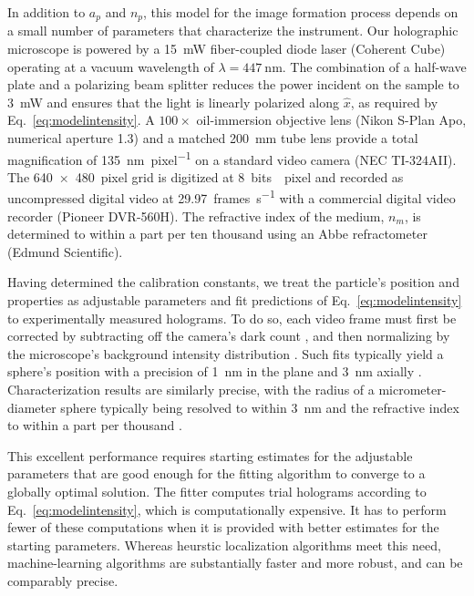 \documentclass[10pt,letterpaper]{article}
\begin{document}
In addition to $a_p$ and $n_p$, this model for the
image formation process depends on a small number of
parameters that characterize the instrument.
Our holographic microscope is powered by
a \SI{15}{\milli\watt} fiber-coupled diode laser (Coherent Cube)
operating at a vacuum wavelength of 
$\lambda = \SI{447}{\nm}$.  
The combination of a half-wave plate and a polarizing 
beam splitter reduces the
power incident on the sample to \SI{3}{\milli\watt} and ensures
that the light is linearly polarized along $\hat{x}$,
as required by Eq.~\eqref{eq:modelintensity}.
A $100\times$ oil-immersion objective lens
(Nikon S-Plan Apo, numerical aperture 1.3) and a matched \SI{200}{\mm}
tube lens provide a total magnification of \SI{135}{\nm\per pixel}
on a standard video camera (NEC TI-324AII). The 
\SI{640 x 480}{pixel} grid is digitized at \SI{8}{bits \per pixel} 
and recorded as uncompressed digital video at 
\SI{29.97}{frames\per\second} with a commercial digital video 
recorder (Pioneer DVR-560H).  The refractive 
index of the medium, $n_m$, is determined to within a part 
per ten thousand using an Abbe refractometer (Edmund Scientific).

Having determined the calibration constants,
we treat the particle's position and properties as 
adjustable parameters and fit predictions of
Eq.~\eqref{eq:modelintensity} to experimentally measured holograms.
To do so, each video frame must first be 
corrected by subtracting off the camera's dark count 
\cite{wang16a}, and then
normalizing by the microscope's background intensity distribution \cite{lee07a}. 
Such fits typically yield a sphere's position with a precision of 
\SI{1}{\nm} in the plane and \SI{3}{\nm} axially 
\cite{cheong09,cheong10a}. 
Characterization results are similarly precise, 
with the radius of a micrometer-diameter sphere typically 
being resolved to within \SI{3}{\nm} and the refractive index to 
within a part per thousand \cite{krishnatreya14,shpaisman12}.

This excellent performance requires starting 
estimates for the adjustable parameters that are
good enough for the fitting 
algorithm to converge to a globally optimal solution. 
The fitter computes trial holograms according to
Eq.~\eqref{eq:modelintensity}, which is computationally 
expensive.
It has to perform fewer of these computations when it is
provided with better estimates for the starting parameters.
Whereas heurstic localization algorithms meet this need,
machine-learning algorithms are substantially faster and
more robust, and can be comparably precise.
\end{document}
